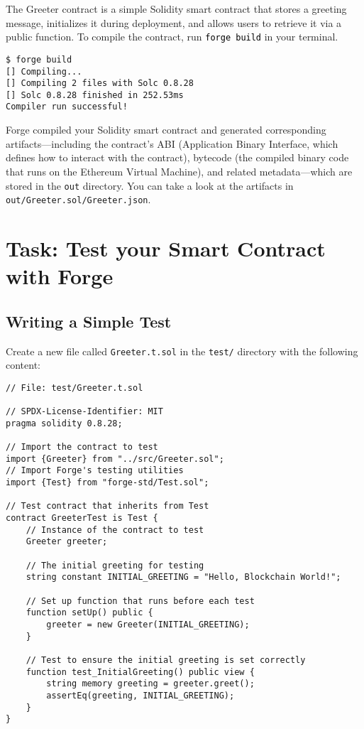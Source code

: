 \documentclass[12pt]{article}
\newcommand{\codeblack}[1]{%
  \texttt{\colorbox{black!7}{\textcolor{black}{#1}}}%
}
\begin{document}
The Greeter contract is a simple Solidity smart contract that stores a greeting message, initializes it during deployment, and allows users to retrieve it via a public function. To compile the contract, run \codeblack{forge build} in your terminal.

\begin{verbatim}
$ forge build
[] Compiling...
[] Compiling 2 files with Solc 0.8.28
[] Solc 0.8.28 finished in 252.53ms
Compiler run successful!
\end{verbatim}

Forge compiled your Solidity smart contract and generated corresponding artifacts—including the contract's ABI (Application Binary Interface, which defines how to interact with the contract), bytecode (the compiled binary code that runs on the Ethereum Virtual Machine), and related metadata—which are stored in the \texttt{out} directory. You can take a look at the artifacts in \texttt{out/Greeter.sol/Greeter.json}.

\section{Task: Test your Smart Contract with Forge}

\subsection{Writing a Simple Test}

Create a new file called \texttt{Greeter.t.sol} in the \texttt{test/} directory with the following content:

\begin{lstlisting}[language=Solidity]
// File: test/Greeter.t.sol

// SPDX-License-Identifier: MIT
pragma solidity 0.8.28;

// Import the contract to test
import {Greeter} from "../src/Greeter.sol";
// Import Forge's testing utilities
import {Test} from "forge-std/Test.sol";

// Test contract that inherits from Test
contract GreeterTest is Test {
    // Instance of the contract to test
    Greeter greeter;
    
    // The initial greeting for testing
    string constant INITIAL_GREETING = "Hello, Blockchain World!";
    
    // Set up function that runs before each test
    function setUp() public {
        greeter = new Greeter(INITIAL_GREETING);
    }
    
    // Test to ensure the initial greeting is set correctly
    function test_InitialGreeting() public view {
        string memory greeting = greeter.greet();
        assertEq(greeting, INITIAL_GREETING);
    }
}
\end{lstlisting}
\end{document}
